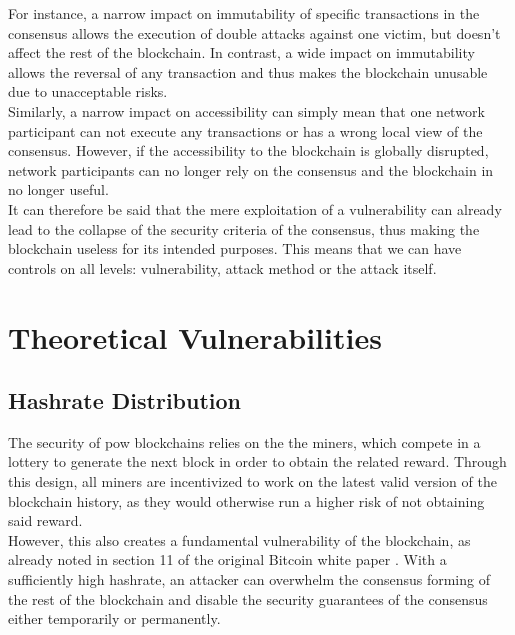 \documentclass[12pt,a4paper]{article}
\begin{document}
For instance, a narrow impact on immutability of specific \glspl{transaction} in the \gls{consensus} allows the execution of \gls{double} attacks against one victim, but doesn't affect the rest of the \gls{blockchain}. In contrast, a wide impact on immutability allows the reversal of any \gls{transaction} and thus makes the \gls{blockchain} unusable due to unacceptable risks.\\

Similarly, a narrow impact on accessibility can simply mean that one network participant can not execute any \glspl{transaction} or has a wrong local view of the \gls{consensus}. However, if the accessibility to the \gls{blockchain} is globally disrupted, network participants can no longer rely on the \gls{consensus} and the \gls{blockchain} in no longer useful.\\

It can therefore be said that the mere exploitation of a vulnerability can already lead to the collapse of the security criteria of the \gls{consensus}, thus making the \gls{blockchain} useless for its intended purposes. This means that we can have controls on all levels: vulnerability, attack method or the attack itself.\\

\section{Theoretical Vulnerabilities}

\subsection{Hashrate Distribution}

The security of \acrshort{pow} blockchains relies on the the miners, which compete in a lottery to generate the next block in order to obtain the related \gls{reward}. Through this design, all miners are incentivized to work on the latest valid version of the blockchain history, as they would otherwise run a higher risk of not obtaining said \gls{reward}.\\

However, this also creates a fundamental vulnerability of the \gls{blockchain}, as already noted in section 11 of the original Bitcoin white paper \cite{bitcoin}. With a sufficiently high \gls{hashrate}, an attacker can overwhelm the consensus forming of the rest of the \gls{blockchain} and disable the security guarantees of the \gls{consensus} either temporarily or permanently.\\
\end{document}
